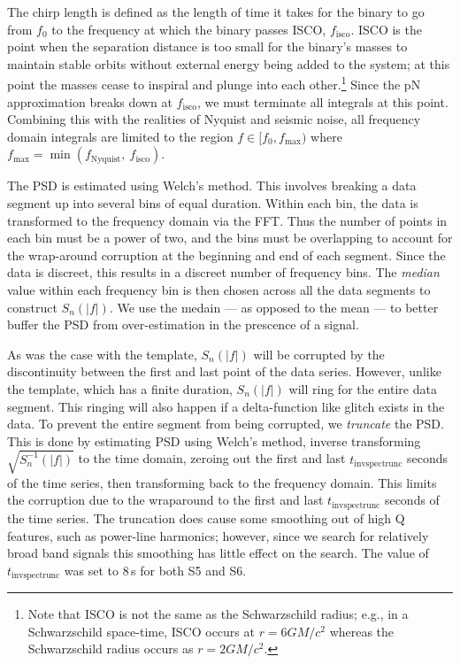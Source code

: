 The chirp length is defined as the length of time it takes for the binary to go from $f_0$ to the frequency at which the binary passes \ac{ISCO}, $f_{\mathrm{isco}}$. \ac{ISCO} is the point when the separation distance is too small for the binary's masses to maintain stable orbits without external energy being added to the system; at this point the masses cease to inspiral and plunge into each other.\footnote{Note that \ac{ISCO} is not the same as the Schwarzschild radius; e.g., in a Schwarzschild space-time, \ac{ISCO} occurs at $r = 6GM/c^2$ whereas the Schwarzschild radius occurs as $r = 2GM/c^2$.} Since the \ac{pN} approximation breaks down at $f_{\mathrm{isco}}$, we must terminate all integrals at this point. Combining this with the realities of Nyquist and seismic noise, all frequency domain integrals are limited to the region $f \in [f_0, f_{\mathrm{max}})$ where $f_{\mathrm{max}} = \min(f_{\mathrm{Nyquist}},~f_{\mathrm{isco}})$.

The \ac{PSD} is estimated using Welch's method. This involves breaking a data segment up into several bins of equal duration. Within each bin, the data is transformed to the frequency domain via the \ac{FFT}. Thus the number of points in each bin must be a power of two, and the bins must be overlapping to account for the wrap-around corruption at the beginning and end of each segment. Since the data is discreet, this results in a discreet number of frequency bins. The \emph{median} value within each frequency bin is then chosen across all the data segments to construct $S_n(|f|)$. We use the medain --- as opposed to the mean --- to better buffer the \ac{PSD} from over-estimation in the prescence of a signal.

As was the case with the template, $S_n(|f|)$ will be corrupted by the discontinuity between the first and last point of the data series. However, unlike the template, which has a finite duration, $S_n(|f|)$ will ring for the entire data segment. This ringing will also happen if a delta-function like glitch exists in the data. To prevent the entire segment from being corrupted, we \emph{truncate} the \ac{PSD}. This is done by estimating \ac{PSD} using Welch's method, inverse transforming $\sqrt{S_n^{-1}(|f|)}$ to the time domain, zeroing out the first and last $t_{\mathrm{invspectrunc}}$ seconds of the time series, then transforming back to the frequency domain. This limits the corruption due to the wraparound to the first and last $t_{\mathrm{invspectrunc}}$ seconds of the time series. The truncation does cause some smoothing out of high Q features, such as power-line harmonics; however, since we search for relatively broad band signals this smoothing has little effect on the search. The value of $t_{\mathrm{invspectrunc}}$ was set to $8\,$s for both \ac{S5} and \ac{S6}.

